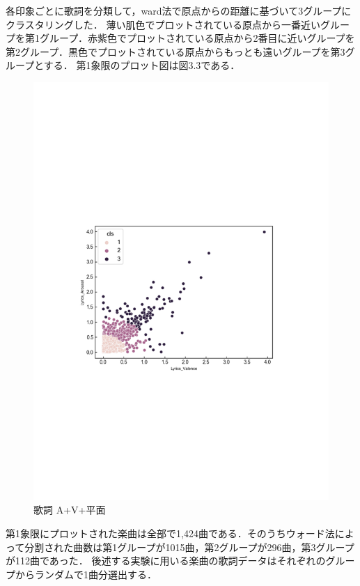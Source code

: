 各印象ごとに歌詞を分類して，ward法で原点からの距離に基づいて3グループにクラスタリングした．
薄い肌色でプロットされている原点から一番近いグループを第1グループ．赤紫色でプロットされている原点から2番目に近いグループを第2グループ．黒色でプロットされている原点からもっとも遠いグループを第3グループとする．
\newpage
第1象限のプロット図は図3.3である．
\begin{figure}[H]
  \centering
  \includegraphics[width=14cm]{lyrics_A+V+.pdf}
  \vspace{-1mm}
  \caption{歌詞 A+V+平面}
  \label{fig:vkall}
  \vspace{5mm}
\end{figure}
第1象限にプロットされた楽曲は全部で1,424曲である．そのうちウォード法によって分割された曲数は第1グループが1015曲，第2グループが296曲，第3グループが112曲であった．
後述する実験に用いる楽曲の歌詞データはそれぞれのグループからランダムで1曲分選出する．
